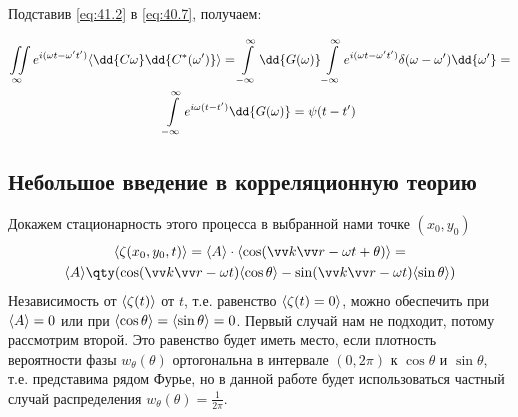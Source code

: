 Подставив \eqref{eq:41.2}  в \eqref{eq:40.7}, получаем:

\begin{gather}
	\iint\limits_{\infty} e^{i(\omega t - \omega't')} \mean{\dd{C{\omega}}\dd{C^*(\omega')}}= 
	\int\limits_{-\infty}^{\infty}\dd{G(\omega)}
	\int\limits_{-\infty}^{\infty} e^{i(\omega t - \omega't')} \delta(\omega-\omega')\dd{\omega'}=\\
	 \int\limits_{-\infty}^{\infty} e^{i \omega (t-t')} \dd{G(\omega)}=\psi(t-t')
\end{gather}



\subsection{Небольшое введение в корреляционную теорию}
Докажем стационарность этого процесса в выбранной нами точке $(x_0,y_0)$
\begin{gather}
	\mean { \zeta(x_0,y_0,t) } = 
	\mean{A}\cdot \mean{\cos(\vec k \vec r -\omega t +\theta)} = \\
	\mean{A} \qty( \cos(\vec k \vec r -\omega t) \mean{\cos\theta}
		- \sin(\vec k \vec r -\omega t)\mean{\sin{\theta}} )
\end{gather}
Независимость от $\langle\zeta(t)\rangle$ от $t$, т.е. равенство $\langle\zeta (t)=0\rangle$, можно обеспечить при  $\langle A\rangle=0$ или при $\langle\cos\theta\rangle=\langle\sin\theta\rangle=0$. Первый случай нам не подходит, потому рассмотрим второй. Это равенство будет иметь место, если плотность вероятности фазы $w_{\theta}(\theta)$ ортогональна в интервале $(0, 2\pi)$
к $\cos\theta$ и $\sin\theta$, т.е. представима рядом Фурье, но в данной работе будет использоваться частный случай распределения $w_{\theta}(\theta)=\frac{1}{2\pi}$.

